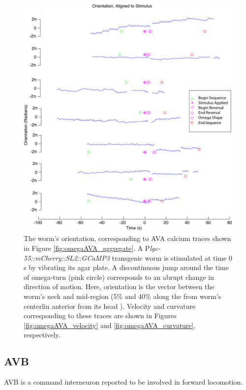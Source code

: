 \begin{figure}  %
\includegraphics[width=\textwidth]{figures/omegaAVA_orientation}
\caption[Corresponding orientation for seven sequences from four worms.]{The worm's orientation, corresponding to AVA calcium traces shown in Figure \ref{fig:omegaAVA_aggregate}. A P\textit{lgc-55::mCherry::SL2::GCaMP3} transgenic worm is stimulated at time 0 s by vibrating its agar plate. A discontinuous jump around the time of omega-turn (pink circle) corresponds to an abrupt change in direction of motion. Here, orientation is the vector between the worm's neck and mid-region (5\%  and 40\%  along the from worm's centerlin anterior from its  head ). Velocity and curvature corresponding to these traces are shown in Figures \ref{fig:omegaAVA_velocity} and \ref{fig:omegaAVA_curvature}, respectively.  \label{fig:omegaAVA_orientation}}
\end{figure}

\subsection{AVB}
AVB is a command interneuron reported to be involved in forward locomotion. 




